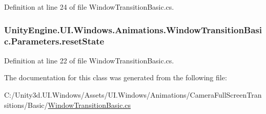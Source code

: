 Definition at line 24 of file Window\+Transition\+Basic.\+cs.

\hypertarget{class_unity_engine_1_1_u_i_1_1_windows_1_1_animations_1_1_window_transition_basic_1_1_parameters_a032c15c1e1469238dd7077ad9c172fd3}{}
\subsubsection[{reset\+State}]{ Unity\+Engine.\+U\+I.\+Windows.\+Animations.\+Window\+Transition\+Basic.\+Parameters.\+reset\+State}\label{class_unity_engine_1_1_u_i_1_1_windows_1_1_animations_1_1_window_transition_basic_1_1_parameters_a032c15c1e1469238dd7077ad9c172fd3}


Definition at line 22 of file Window\+Transition\+Basic.\+cs.



The documentation for this class was generated from the following file\+:\begin{DoxyCompactItemize}
\item 
C\+:/\+Unity3d.\+U\+I.\+Windows/\+Assets/\+U\+I.\+Windows/\+Animations/\+Camera\+Full\+Screen\+Transitions/\+Basic/\hyperlink{_window_transition_basic_8cs}{Window\+Transition\+Basic.\+cs}\end{DoxyCompactItemize}
